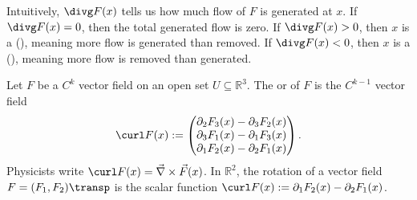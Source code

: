 \begin{ainote}
Intuitively, $\divg F(x)$ tells us how much flow of $F$ is generated at $x$. If $\divg F(x) = 0$, then the total generated flow is zero.
If $\divg F(x) > 0$, then $x$ is a  (), meaning more flow is generated than removed.
If $\divg F(x) < 0$, then $x$ is a  (), meaning more flow is removed than generated.

\begin{center}
\end{center}
\end{ainote}

\begin{definition}
\label{def:rotation}
Let $F$ be a $C^k$ vector field on an open set $U \subseteq \mathbb{R}^3$. The  or  of $F$ is the $C^{k-1}$ vector field
\[\curl F(x) := \begin{pmatrix} \partial_2 F_3(x) - \partial_3 F_2(x) \\ \partial_3 F_1(x) - \partial_1 F_3(x) \\ \partial_1 F_2(x) - \partial_2 F_1(x) \end{pmatrix}.\]
Physicists write $\curl F(x) = \vec{\nabla} \times \vec{F}(x)$.
In $\mathbb{R}^2$, the rotation of a vector field $F = (F_1, F_2)\transp$ is the scalar function $\curl F(x) := \partial_1 F_2(x) - \partial_2 F_1(x)$.
\end{definition}

